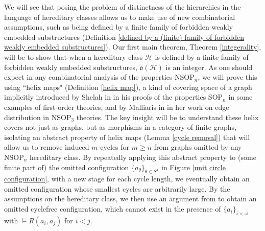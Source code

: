 \documentclass{amsart}
\theoremstyle{definition}
\theoremstyle{remark}
\numberwithin{equation}{section}
\begin{document}
We will see that posing the problem of distinctness of the hierarchies in the language of hereditary classes allows us to make use of new combinatorial assumptions, such as being defined by a finite family of forbidden weakly embedded substructures (Definition \ref{defined by a (finite) family of forbidden weakly embedded substructures}). Our first main theorem, Theorem \ref{integerality}, will be to show that when a hereditary class $\mathcal{H}$ is defined by a finite family of forbidden weakly embedded substructures, $\mathfrak{o}(\mathcal{H})$ is an integer. As one should expect in any combinatorial analysis of the properties $\mathrm{NSOP}_{n}$, we will prove this using ``helix maps" (Definition \ref{helix map}), a kind of covering space of a graph implicitly introduced by Shelah in \cite{She95} in his proofs of the properties $\mathrm{SOP}_{n}$ in some examples of first-order theories, and by Malliaris in \cite{Mal10b} in her work on edge distribution in $\mathrm{NSOP}_{3}$ theories. The key insight will be to understand these helix covers not just as graphs, but as morphisms in a category of finite graphs, isolating an abstract property of helix maps (Lemma \ref{cycle removal}) that will allow us to remove induced $m$-cycles for $m \geq n$ from graphs omitted by any $\mathrm{NSOP}_{n}$ hereditary class. By repeatedly applying this abstract property to (some finite part of) the omitted configuration $\{a_{\theta}\}_{\theta \in S^{1}}$ in Figure \ref{unit circle configuration}, with a new stage for each cycle length, we eventually obtain an omitted configuration whose smallest cycles are arbitrarily large. By the assumptions on the hereditary class, we then use an argument from \cite{LZ17} to obtain an omitted cyclefree configuration, which cannot exist in the presence of $\{a_{i}\}_{i< \omega}$ with $\models R(a_{i}, a_{j})$ for $i < j$.
\end{document}
